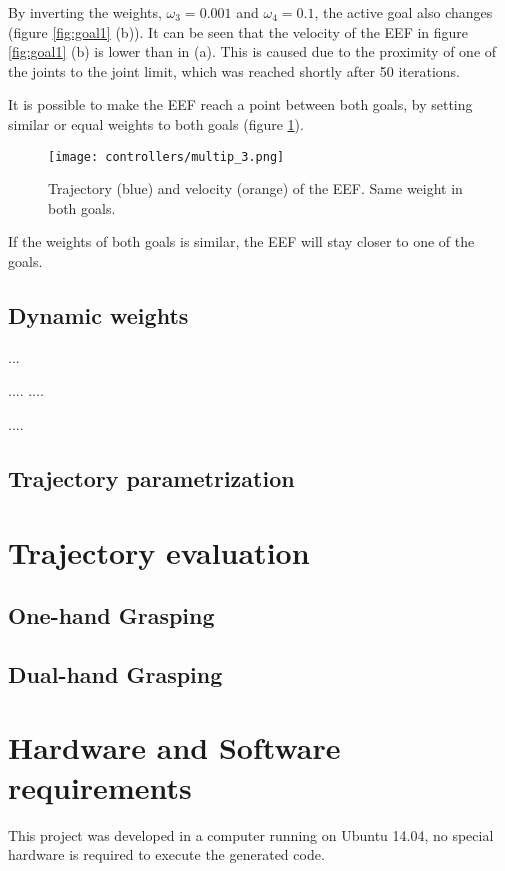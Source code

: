 By inverting the weights, $\omega_{3} = 0.001$ and $\omega_{4} = 0.1$, the active goal also changes (figure \ref{fig:goal1} (b)). It can be seen that the velocity of the EEF in figure \ref{fig:goal1} (b) is lower than in (a). This is caused due to the proximity of one of the joints to the joint limit, which was reached shortly after 50 iterations.

It is possible to make the EEF reach a point between both goals, by setting similar or equal weights to both goals (figure \ref{fig:goal2}). 
\begin{figure}[H]
	\centering
	\texttt{[image: controllers/multip\_3.png]}
	\vspace{-10pt}
	\caption[Multiple goals: Middle point]{Trajectory (blue) and velocity (orange) of the EEF. Same weight in both goals.}
	\vspace{-15pt}
	\label{fig:goal2}
\end{figure}
If the weights of both goals is similar, the EEF will stay closer to one of the goals.

\subsection{Dynamic weights}

...

....
....

....

\subsection{Trajectory parametrization}
\section{Trajectory evaluation}
\subsection{One-hand Grasping}
\subsection{Dual-hand Grasping}

\section{Hardware and Software requirements}
\label{subsec:software}

This project was developed in a computer running on Ubuntu 14.04, no special hardware is required to execute the generated code.

